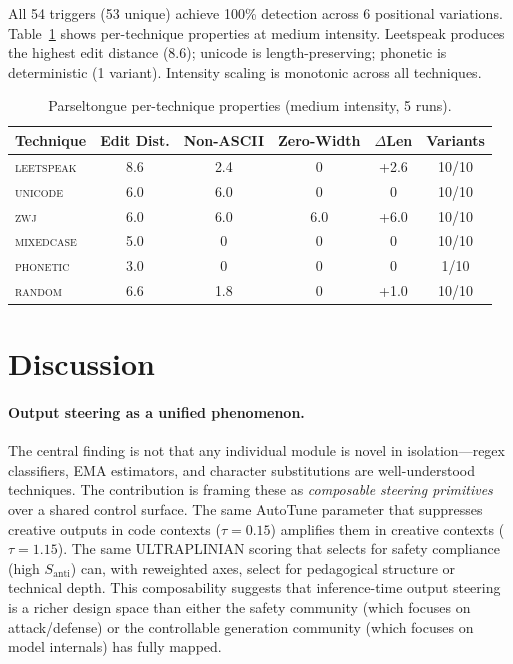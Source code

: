\documentclass[11pt]{article}
\begin{document}
All 54 triggers (53 unique) achieve 100\% detection across 6 positional variations. Table~\ref{tab:parseltongue} shows per-technique properties at medium intensity. Leetspeak produces the highest edit distance (8.6); unicode is length-preserving; phonetic is deterministic (1 variant). Intensity scaling is monotonic across all techniques.

\begin{table}[t]
\caption{Parseltongue per-technique properties (medium intensity, 5 runs).}
\label{tab:parseltongue}
\centering
\small
\begin{tabular}{@{}lccccc@{}}
\toprule
Technique & Edit Dist. & Non-ASCII & Zero-Width & $\Delta$Len & Variants \\
\midrule
\textsc{leetspeak} & 8.6 & 2.4 & 0 & +2.6 & 10/10 \\
\textsc{unicode}   & 6.0 & 6.0 & 0 & 0    & 10/10 \\
\textsc{zwj}       & 6.0 & 6.0 & 6.0 & +6.0 & 10/10 \\
\textsc{mixedcase} & 5.0 & 0   & 0 & 0    & 10/10 \\
\textsc{phonetic}  & 3.0 & 0   & 0 & 0    & 1/10 \\
\textsc{random}    & 6.6 & 1.8 & 0 & +1.0 & 10/10 \\
\bottomrule
\end{tabular}
\end{table}

\section{Discussion}

\paragraph{Output steering as a unified phenomenon.}
The central finding is not that any individual module is novel in isolation---regex classifiers, EMA estimators, and character substitutions are well-understood techniques. The contribution is framing these as \emph{composable steering primitives} over a shared control surface. The same AutoTune parameter that suppresses creative outputs in code contexts ($\tau=0.15$) amplifies them in creative contexts ($\tau=1.15$). The same ULTRAPLINIAN scoring that selects for safety compliance (high $S_{\text{anti}}$) can, with reweighted axes, select for pedagogical structure or technical depth. This composability suggests that inference-time output steering is a richer design space than either the safety community (which focuses on attack/defense) or the controllable generation community (which focuses on model internals) has fully mapped.
\end{document}
